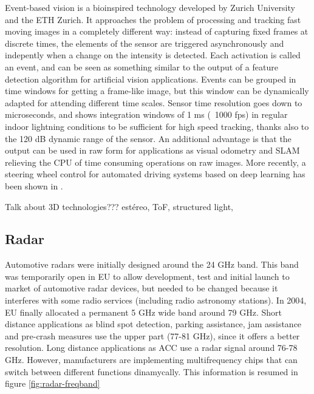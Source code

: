 Event-based vision is a bioinspired technology developed by Zurich University
and the ETH Zurich. It approaches the problem of processing and tracking fast 
moving images in a completely different way: instead of capturing fixed frames
at discrete times, the elements of the sensor are triggered asynchronously and
indepently when a change on the intensity is detected. Each activation is
called an event, and can be seen as something similar to the output of a 
feature detection algorithm for artificial vision applications.
Events can be grouped in time windows for getting a frame-like image, but this
window can be dynamically adapted for attending different time scales.
Sensor time resolution goes down to microseconds, and \cite{Mueggler2014} shows 
integration windows of 1 ms (~1000 fps) in regular indoor lightning conditions
to be sufficient for high speed tracking, thanks also to the 120 dB dynamic 
range of the sensor.
An additional advantage is that the output can be used in raw form for 
applications as visual odometry \cite{Censi2014} and SLAM \cite{Vidal2017}
relieving the CPU of time consuming operations on raw images.
More recently, a steering wheel control for automated driving systems 
based on deep learning has been shown in \cite{Maqueda2018}.
 
 
 
 Talk about 3D technologies??? estéreo, ToF, structured light, 
 

\subsection{Radar}


Automotive radars were initially designed around the 24 GHz band. This band was temporarily open in EU to allow development, test and initial launch to market of
automotive radar devices, but needed to be changed because it interferes with some radio services (including radio astronomy stations).
In 2004, EU finally allocated a permanent 5 GHz wide band around 79 GHz. Short 
distance applications as blind spot detection, parking assistance, jam 
assistance and pre-crash measures use the upper part (77-81 GHz), since it 
offers a better resolution. Long distance applications as ACC use a radar 
signal around 76-78 GHz. However, manufacturers are implementing multifrequency 
chips that can switch between different functions dinamycally.
This information is resumed in figure \ref{fig:radar-freqband}

